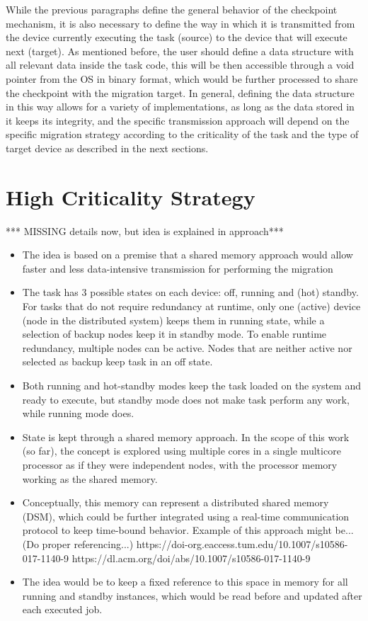 While the previous paragraphs define the general behavior of the checkpoint mechanism, it is also necessary to define the way in which it is transmitted from the device currently executing the task (source) to the device that will execute next (target). As mentioned before, the user should define a data structure with all relevant data inside the task code, this will be then accessible through a void pointer from the OS in binary format, which would be further processed to share the checkpoint with the migration target. In general, defining the data structure in this way allows for a variety of implementations, as long as the data stored in it keeps its integrity, and the specific transmission approach will depend on the specific migration strategy according to the criticality of the task and the type of target device as described in the next sections.


\section{High Criticality Strategy}
*** MISSING details now, but idea is explained in approach***
\begin{itemize}
	\item The idea is based on a premise that a shared memory approach would allow faster and less data-intensive transmission for performing the migration
	\item The task has 3 possible states on each device: off, running and (hot) standby. For tasks that do not require redundancy at runtime, only one (active) device (node in the distributed system) keeps them in running state, while a selection of backup nodes keep it in standby mode. To enable runtime redundancy, multiple nodes can be active. Nodes that are neither active nor selected as backup keep task in an off state.
	\item Both running and hot-standby modes keep the task loaded on the system and ready to execute, but standby mode does not make task perform any work, while running mode does.
	\item State is kept through a shared memory approach. In the scope of this work (so far), the concept is explored using multiple cores in a single multicore processor as if they were independent nodes, with the processor memory working as the shared memory.
	\item Conceptually, this memory can represent a distributed shared memory (DSM), which could be further integrated using a real-time communication protocol to keep time-bound behavior. Example of this approach might be... (Do proper referencing...) https://doi-org.eaccess.tum.edu/10.1007/s10586-017-1140-9 https://dl.acm.org/doi/abs/10.1007/s10586-017-1140-9
	\item The idea would be to keep a fixed reference to this space in memory for all running and standby instances, which would be read before and updated after each executed job.
\end{itemize}


